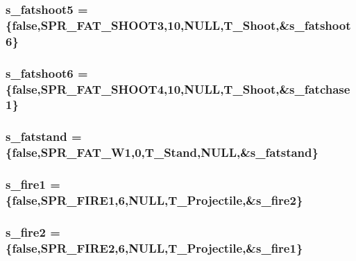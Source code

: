 \label{WL__ACT2_8C_ab59a9c3c1f25eabf66d2a28f67736bda}
\hypertarget{WL__ACT2_8C_a1861ef3ba422896e82356ef2a3c64322}{
\subsubsection[{s\_\-fatshoot5}]{ {\bf s\_\-fatshoot5} = \{false,SPR\_\-FAT\_\-SHOOT3,10,NULL,T\_\-Shoot,\&{\bf s\_\-fatshoot6}\}}}
\label{WL__ACT2_8C_a1861ef3ba422896e82356ef2a3c64322}
\hypertarget{WL__ACT2_8C_a7c7310a1228963b42e6c532e05d1fabb}{
\subsubsection[{s\_\-fatshoot6}]{ {\bf s\_\-fatshoot6} = \{false,SPR\_\-FAT\_\-SHOOT4,10,NULL,T\_\-Shoot,\&{\bf s\_\-fatchase1}\}}}
\label{WL__ACT2_8C_a7c7310a1228963b42e6c532e05d1fabb}
\hypertarget{WL__ACT2_8C_a983e58a59fd14d69865e570041327ce1}{
\subsubsection[{s\_\-fatstand}]{ {\bf s\_\-fatstand} = \{false,SPR\_\-FAT\_\-W1,0,T\_\-Stand,NULL,\&{\bf s\_\-fatstand}\}}}
\label{WL__ACT2_8C_a983e58a59fd14d69865e570041327ce1}
\hypertarget{WL__ACT2_8C_a3247cee4b08b528908e9762b1f92b3dd}{
\subsubsection[{s\_\-fire1}]{ {\bf s\_\-fire1} = \{false,SPR\_\-FIRE1,6,NULL,T\_\-Projectile,\&{\bf s\_\-fire2}\}}}
\label{WL__ACT2_8C_a3247cee4b08b528908e9762b1f92b3dd}
\hypertarget{WL__ACT2_8C_a216d8ef5aaac32a48b60e5b348b84678}{
\subsubsection[{s\_\-fire2}]{ {\bf s\_\-fire2} = \{false,SPR\_\-FIRE2,6,NULL,T\_\-Projectile,\&{\bf s\_\-fire1}\}}}

